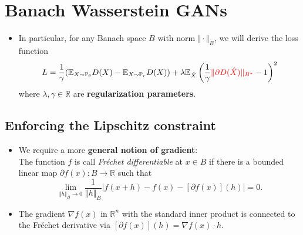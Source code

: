 \documentclass[landscape,headrule,footrule]{foils}
\begin{document}
\section{Banach Wasserstein GANs}
\tableofcontents
\begin{frame}
\begin{flushleft}
\begin{itemize}
\item In particular, for any Banach space $B$ with norm $ \Vert\cdot\Vert_B$, we will derive the loss function
\begin{equation}
L = \dfrac{1}{\gamma} (\mathbb{E}_{X \sim \mathbb{P}_{\theta}} D(X)-\mathbb{E}_{X \sim \mathbb{P}_{r}} D(X)) + \lambda \mathbb{E}_{\hat{X}} \left(\dfrac{1}{\gamma} \textcolor{red}{\Vert \partial D(\hat{X}) \Vert_{B^*}} - 1 \right)^2
\end{equation}
where $\lambda,\gamma \in \mathbb{R}$ are \textbf{regularization parameters}.
\end{itemize}
\end{flushleft}
\end{frame}

\subsection{Enforcing the Lipschitz constraint}
\tableofcontents
\begin{frame}
\begin{flushleft}
\begin{itemize}
\item We require a more \textbf{general notion of gradient}: \\
The function $f$ is call \textit{Fréchet differentiable} at $x \in B$ if there is a bounded linear map $\partial f(x) :B \rightarrow \mathbb{R}$ such that
\begin{equation}
\mathop{\lim}_{\Vert h \Vert_B \rightarrow 0} \dfrac{1}{\Vert h \Vert_B} |f(x+h) - f(x) - [\partial f(x)] (h)| = 0.
\end{equation}
\item The gradient $\nabla f(x)$ in $\mathbb{R}^n$ with the standard inner product is connected to  the Fréchet derivative via $[\partial f(x)](h) = \nabla f(x) \cdot h$.
\\
\end{itemize}
\end{flushleft}
\end{frame}
\end{document}
